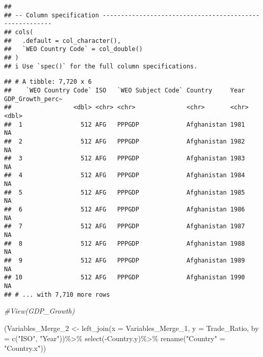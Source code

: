 \documentclass[
]{article}
\newenvironment{Shaded}{\begin{snugshade}}{\end{snugshade}}
\newcommand{\AttributeTok}[1]{\textcolor[rgb]{0.77,0.63,0.00}{#1}}
\newcommand{\CommentTok}[1]{\textcolor[rgb]{0.56,0.35,0.01}{\textit{#1}}}
\newcommand{\FunctionTok}[1]{\textcolor[rgb]{0.00,0.00,0.00}{#1}}
\newcommand{\NormalTok}[1]{#1}
\newcommand{\OtherTok}[1]{\textcolor[rgb]{0.56,0.35,0.01}{#1}}
\newcommand{\SpecialCharTok}[1]{\textcolor[rgb]{0.00,0.00,0.00}{#1}}
\newcommand{\StringTok}[1]{\textcolor[rgb]{0.31,0.60,0.02}{#1}}
\begin{document}
\begin{verbatim}
## 
## -- Column specification --------------------------------------------------------
## cols(
##   .default = col_character(),
##   `WEO Country Code` = col_double()
## )
## i Use `spec()` for the full column specifications.
\end{verbatim}

\begin{verbatim}
## # A tibble: 7,720 x 6
##    `WEO Country Code` ISO   `WEO Subject Code` Country     Year  GDP_Growth_perc~
##                 <dbl> <chr> <chr>              <chr>       <chr>            <dbl>
##  1                512 AFG   PPPGDP             Afghanistan 1981                NA
##  2                512 AFG   PPPGDP             Afghanistan 1982                NA
##  3                512 AFG   PPPGDP             Afghanistan 1983                NA
##  4                512 AFG   PPPGDP             Afghanistan 1984                NA
##  5                512 AFG   PPPGDP             Afghanistan 1985                NA
##  6                512 AFG   PPPGDP             Afghanistan 1986                NA
##  7                512 AFG   PPPGDP             Afghanistan 1987                NA
##  8                512 AFG   PPPGDP             Afghanistan 1988                NA
##  9                512 AFG   PPPGDP             Afghanistan 1989                NA
## 10                512 AFG   PPPGDP             Afghanistan 1990                NA
## # ... with 7,710 more rows
\end{verbatim}

\begin{Shaded}
\begin{Highlighting}[]
\CommentTok{\#View(GDP\_Growth)}

\NormalTok{(Variables\_Merge\_2 }\OtherTok{\textless{}{-}} \FunctionTok{left\_join}\NormalTok{(}\AttributeTok{x =}\NormalTok{ Variables\_Merge\_1, }\AttributeTok{y =}\NormalTok{ Trade\_Ratio, }\AttributeTok{by =} \FunctionTok{c}\NormalTok{(}\StringTok{"ISO"}\NormalTok{, }\StringTok{"Year"}\NormalTok{))}\SpecialCharTok{\%\textgreater{}\%}
  \FunctionTok{select}\NormalTok{(}\SpecialCharTok{{-}}\NormalTok{Country.y)}\SpecialCharTok{\%\textgreater{}\%}
  \FunctionTok{rename}\NormalTok{(}\StringTok{"Country"} \OtherTok{=} \StringTok{"Country.x"}\NormalTok{))}
\end{Highlighting}
\end{Shaded}
\end{document}
